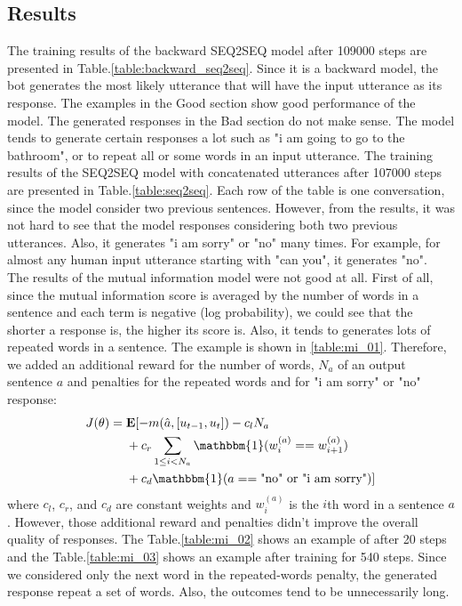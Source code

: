 \documentclass[letterpaper]{article}
\begin{document}
\subsection{Results}
The training results of the backward SEQ2SEQ model after 109000 steps are presented in Table.\ref{table:backward_seq2seq}. Since it is a backward model, the bot generates the most likely utterance that will have the input utterance as its response. The examples in the Good section show good performance of the model. The generated responses in the Bad section do not make sense. The model tends to generate certain responses a lot such as "i am going to go to the bathroom", or to repeat all or some words in an input utterance. The training results of the SEQ2SEQ model with concatenated utterances after 107000 steps are presented in Table.\ref{table:seq2seq}. Each row of the table is one conversation, since the model consider two previous sentences. However, from the results, it was not hard to see that the model responses considering both two previous utterances. Also, it generates "i am sorry" or "no" many times. For example, for almost any human input utterance starting with "can you", it generates "no". \\
The results of the mutual information model were not good at all. First of all, since the mutual information score is averaged by the number of words in a sentence and each term is negative (log probability), we could see that the shorter a response is, the higher its score is. Also, it tends to generates lots of repeated words in a sentence. The example is shown in \ref{table:mi_01}. Therefore, we added an additional reward for the number of words, $N_a$ of an output sentence $a$ and penalties for the repeated words and for "i am sorry" or "no" response:
\begin{align}
    J(\theta) =&\; \mathbf{E} [-m(\hat{a},[u_{t-1},u_t])-c_l N_a \nonumber \\
     &\; + c_r \sum_{1\leq i < N_a} \mathbbm{1}(w_i^{(a)} == w_{i+1}^{(a)}) \nonumber \\ 
     &\; +c_d \mathbbm{1}(a == \text{"no" or "i am sorry"})]
\end{align}
where $c_l$, $c_r$, and $c_d$ are constant weights and $w_i^{(a)}$ is the $i$th word in a sentence $a$. However, those additional reward and penalties didn't improve the overall quality of responses. The Table.\ref{table:mi_02} shows an example of after 20 steps and the Table.\ref{table:mi_03} shows an example after training for 540 steps. Since we considered only the next word in the repeated-words penalty, the generated response repeat a set of words. Also, the outcomes tend to be unnecessarily long.
\end{document}
